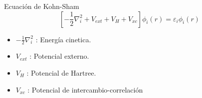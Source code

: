 \begin{frame}{Ecuaci\'on de Kohn-Sham}
    \begin{equation}
    \left[ -\frac{1}{2}\nabla_{i}^{2} + V_{ext}  + V_{H} + V_{xc} \right] 
    \phi_{i}(r) = \varepsilon_{i} \phi_{i}(r) \nonumber
    \end{equation}
    \begin{itemize}
        \item $-\frac{1}{2}\nabla_{i}^{2}$ : Energ\'ia cinetica.
        \item $V_{ext}$ : Potencial externo.
        \item $V_{H}$ : Potencial de Hartree.
        \item $V_{xc}$ : Potencial de intercambio-correlaci\'on
    \end{itemize}
\end{frame}